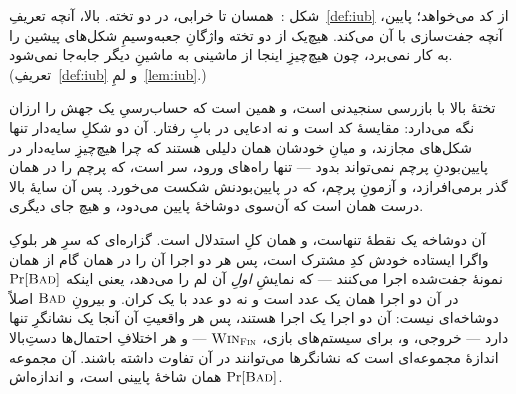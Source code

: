 \documentclass[10pt,oneside,openany]{book}
\newcounter{diagram}
\newcommand{\figcaption}[2]{%
  \par\smallskip
  \refstepcounter{diagram}\label{#1}%
  \parbox{0.92\textwidth}{\footnotesize
    \textcolor{accent}{شکل \thediagram:}\ #2\par}}
\newcommand{\op}[1]{\textnormal{\textsc{#1}}}
\newcommand{\opl}[1]{\hyperlink{op:#1}{\textcolor{accentsoft}{\op{#1}}}}
\newcommand{\atom}[1]{\textcolor{commenttint}{\op{#1}}}
\newcommand{\true}{\atom{true}}
\newcommand{\Win}{\op{Win}}
\newcommand{\Bad}{\op{Bad}}
\newcommand{\V}[1]{\mathtt{#1}}
\theoremstyle{accentdef}
\theoremstyle{accentplain}
\begin{document}
\begin{center}
\figcaption{fig:iub}{همسان تا خرابی، در دو تخته. بالا، آنچه تعریفِ~\ref{def:iub} از کد می‌خواهد؛ پایین، آنچه جفت‌سازی با آن می‌کند. هیچ‌یک از دو تخته واژگانِ جعبه‌و‌سیمِ شکل‌های پیشین را به کار نمی‌برد، چون هیچ‌چیزِ اینجا از ماشینی به ماشینِ دیگر جابه‌جا نمی‌شود. (تعریفِ~\ref{def:iub} و لمِ~\ref{lem:iub}.)}
\end{center}

تختهٔ بالا با بازرسی سنجیدنی است، و همین است که حساب‌رسیِ یک جهش را ارزان
نگه می‌دارد: مقایسهٔ کد است و نه ادعایی در بابِ رفتار. آن دو شکلِ سایه‌دار
تنها شکل‌های مجازند، و میانِ خودشان همان دلیلی هستند که چرا هیچ‌چیزِ
سایه‌دار در پایین‌بودنِ پرچم نمی‌تواند بدود --- تنها راه‌های ورود، سر است،
که پرچم را در همان گذر برمی‌افرازد، و آزمونِ پرچم، که در پایین‌بودنش شکست
می‌خورد. پس آن سایهٔ بالا درست همان است که آن‌سوی دوشاخهٔ پایین می‌دود، و
هیچ جای دیگری.

آن دوشاخه یک نقطهٔ تنهاست، و همان کلِ استدلال است. گزاره‌ای که سرِ هر بلوکِ
واگرا ایستاده خودش کدِ مشترک است، پس هر دو اجرا آن را در همان گام از همان
نمونهٔ جفت‌شده اجرا می‌کنند --- که نمایشِ \emph{اولِ} آن لم را می‌دهد، یعنی
اینکه $\Pr[\Bad]$ در آن دو اجرا همان یک عدد است و نه دو عدد با یک کران. و
بیرونِ $\Bad$ اصلاً دوشاخه‌ای نیست: آن دو اجرا یک اجرا هستند، پس هر واقعیتِ
آن آنجا یک نشانگرِ تنها دارد --- خروجی، و، برای سیستم‌های بازی،
$\Win_{\op{Fin}}$ --- و هر اختلافِ احتمال‌ها دستِ‌بالا اندازهٔ مجموعه‌ای است
که نشانگرها می‌توانند در آن تفاوت داشته باشند. آن مجموعه همان شاخهٔ پایینی
است، و اندازه‌اش $\Pr[\Bad]$.
\end{document}
